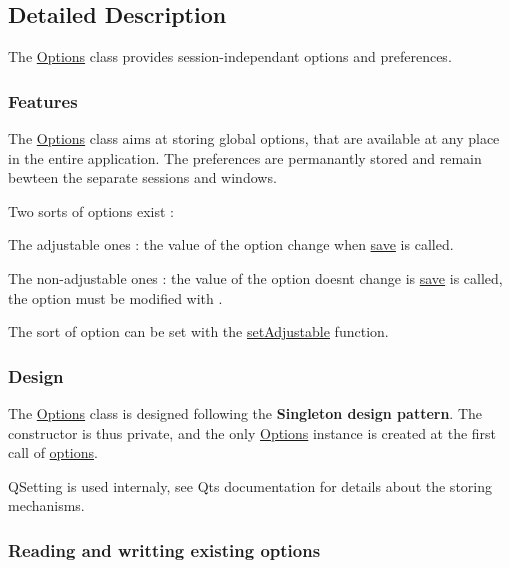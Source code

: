 \subsection{Detailed Description}
The \hyperlink{struct_options}{Options} class provides session-\/independant options and preferences. 

\subsubsection*{Features}

The \hyperlink{struct_options}{Options} class aims at storing global options, that are available at any place in the entire application. The preferences are permanantly stored and remain bewteen the separate sessions and windows.

Two sorts of options exist \+:
\begin{DoxyItemize}
\item The adjustable ones \+: the value of the option change when \hyperlink{struct_options_ad20146ff9544f6229bb1696ea5bf643d}{save} is called.
\item The non-\/adjustable ones \+: the value of the option doesn\textquotesingle{}t change is \hyperlink{struct_options_ad20146ff9544f6229bb1696ea5bf643d}{save} is called, the option must be modified with .
\end{DoxyItemize}

The sort of option can be set with the \hyperlink{struct_options_a086db8fe7688ddcb3b74db85262a5ba0}{set\+Adjustable} function.

\subsubsection*{Design}

The \hyperlink{struct_options}{Options} class is designed following the {\bfseries Singleton design pattern}. The constructor is thus private, and the only \hyperlink{struct_options}{Options} instance is created at the first call of \hyperlink{struct_options_aa3dd7609fbc5d54af65992632bff842a}{options}.

Q\+Setting is used internaly, see Qt\textquotesingle{}s documentation for details about the storing mechanisms.

\subsubsection*{Reading and writting existing options}

